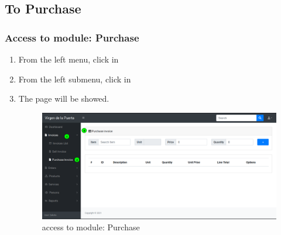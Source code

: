 \documentclass[a4paper,11pt]{refart}
\begin{document}

\subsection{To Purchase}\label{section:to_purchase}
\subsubsection{Access to module: Purchase}
\begin{enumerate}
	\item From the left menu, click in  
	\item From the left submenu, click in  
	\item The page will be showed.
	\begin{figure}[H]\centering
		\includegraphics[width=\textwidth]{images/invoice_purchase-access.png}
		\caption{access to module: Purchase}
		\label{fig:invoice_purchase-access}
	\end{figure}
\end{enumerate}
\end{document}
